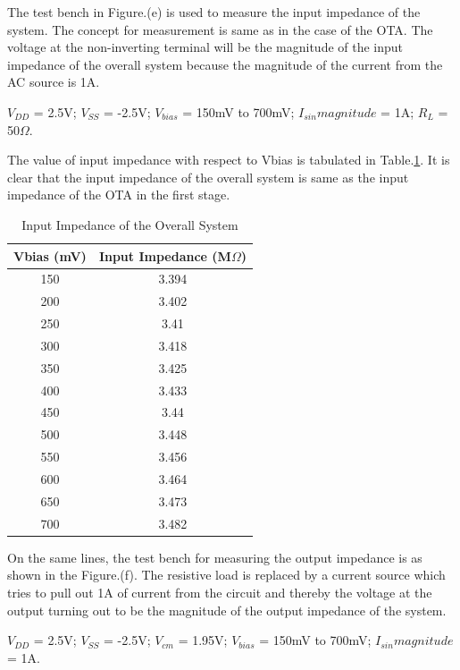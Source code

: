 The test bench in Figure.(e) is used to measure the input impedance of the system. The concept for measurement is same as in the case of the OTA. The voltage at the non-inverting terminal will be the magnitude of the input impedance of the overall system because the magnitude of the current from the AC source is 1A.

$V_{DD}$ = 2.5V; $V_{SS}$ = -2.5V; $V_{bias}$ = 150mV to 700mV;  $I_{sin} magnitude$ = 1A; $R_{L}$ = 50$\Omega$.


The value of input impedance with respect to Vbias is tabulated in Table.\ref{tab:ZIN}. It is clear that the input impedance of the overall system is same as the input impedance of the OTA in the first stage.

\begin{table} [H]
\centering
\begin{tabular}{@{}cc@{}}
\toprule
Vbias (mV)			& Input Impedance (M$\Omega$)	\\ \midrule
150					& 3.394  \\
200					& 3.402  \\
250					& 3.41   \\
300					& 3.418	 \\
350					& 3.425	 \\
400					& 3.433	 \\
450					& 3.44  \\
500					& 3.448 \\
550					& 3.456 \\
600					& 3.464 \\
650					& 3.473 \\
700 				& 3.482 \\
\bottomrule
\end{tabular}
\caption{Input Impedance of the Overall System}
\label{tab:ZIN}
\end{table}

On the same lines, the test bench for measuring the output impedance is as shown in the Figure.(f). The resistive load is replaced by a current source which tries to pull out 1A of current from the circuit and thereby the voltage at the output turning out to be the magnitude of the output impedance of the system.

$V_{DD}$ = 2.5V; $V_{SS}$ = -2.5V; $V_{cm}$ = 1.95V; $V_{bias}$ = 150mV to 700mV;  $I_{sin} magnitude$ = 1A.

